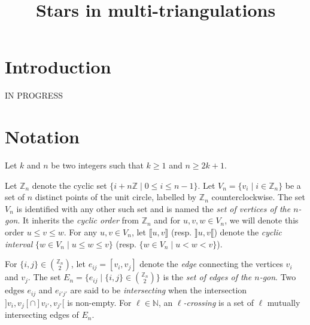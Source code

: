 \documentclass[12pt]{amsart}
\begin{document}
 

\newtheorem{theorem}{Theorem}
\newtheorem{proposition}{Proposition}
\newtheorem{lemma}{Lemma}
\newtheorem{corollary}{Corollary}
\newtheorem{definition}{Definition}
\newenvironment{remark}{\medskip\noindent{\textbf{Remark.}}}{\medskip}
\newenvironment{bibremark}{\begin{footnotesize}\medskip\noindent{\textbf{Bibliographic remark.}}}{\end{footnotesize}\medskip}

\title{Stars in multi-triangulations}

\begin{abstract}
\end{abstract}

\maketitle

\section{Introduction}

IN PROGRESS





\section{Notation}

Let $k$ and $n$ be two integers such that $k\ge 1$ and $n\ge 2k+1$.

Let $\mathbb{Z}_n$ denote the cyclic set $\{i+n\mathbb{Z}\;|\; 0\le i\le n-1\}$.
Let $V_n=\{v_i\;|\; i\in\mathbb{Z}_n\}$ be a set of $n$ distinct points of the unit circle, labelled by $\mathbb{Z}_n$ counterclockwise.
The set $V_n$ is identified with any other such set and is named the \emph{set of vertices of the $n$-gon}.
It inherits the \emph{cyclic order} from $\mathbb{Z}_n$ and for $u,v,w\in V_n$, we will denote this order $u
\le v\le w$.
For any $u,v\in V_n$, let $\llbracket u,v\rrbracket$ (resp. $\rrbracket u,v\llbracket$) denote the \emph{cyclic interval} $\{w\in V_n\;|\; u\le w\le v\}$ (resp. $\{w\in V_n\;|\; u<w<v\}$).

For $\{i,j\}\in{\mathbb{Z}_n \choose 2}$, let $e_{ij}=[v_i,v_j]$ denote the \emph{edge} connecting the vertices $v_i$ and $v_j$. The set $E_n=\{e_{ij}\;|\; \{i,j\}\in{\mathbb{Z}_n \choose 2}\}$ is the \emph{set of edges of the $n$-gon}.
Two edges $e_{ij}$ and $e_{i'j'}$ are said to be \emph{intersecting} when the intersection $]v_i,v_j[\cap]v_{i'},v_{j'}[$ is non-empty.
For $\ell\in\mathbb{N}$, an \emph{$\ell$-crossing} is a set of $\ell$ mutually intersecting edges of $E_n$.
\end{document}
